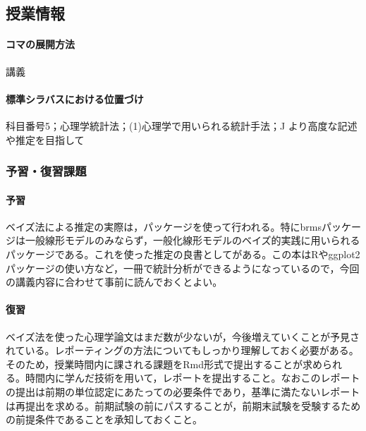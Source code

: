 \subsection{授業情報}
\paragraph{コマの展開方法}
講義
\paragraph{標準シラバスにおける位置づけ}
科目番号5；心理学統計法；(1)心理学で用いられる統計手法；J より高度な記述や推定を目指して
\subsubsection{予習・復習課題}
\paragraph{予習}
ベイズ法による推定の実際は，パッケージを使って行われる。特にbrmsパッケージは一般線形モデルのみならず，一般化線形モデルのベイズ的実践に用いられるパッケージである。これを使った推定の良書として\citet{馬場201907}がある。この本はRやggplot2パッケージの使い方など，一冊で統計分析ができるようになっているので，今回の講義内容に合わせて事前に読んでおくとよい。
\paragraph{復習}
ベイズ法を使った心理学論文はまだ数が少ないが，今後増えていくことが予見されている。レポーティングの方法についてもしっかり理解しておく必要がある。そのため，授業時間内に課される課題をRmd形式で提出することが求められる。時間内に学んだ技術を用いて，レポートを提出すること。なおこのレポートの提出は前期の単位認定にあたっての必要条件であり，基準に満たないレポートは再提出を求める。前期試験の前にパスすることが，前期末試験を受験するための前提条件であることを承知しておくこと。

